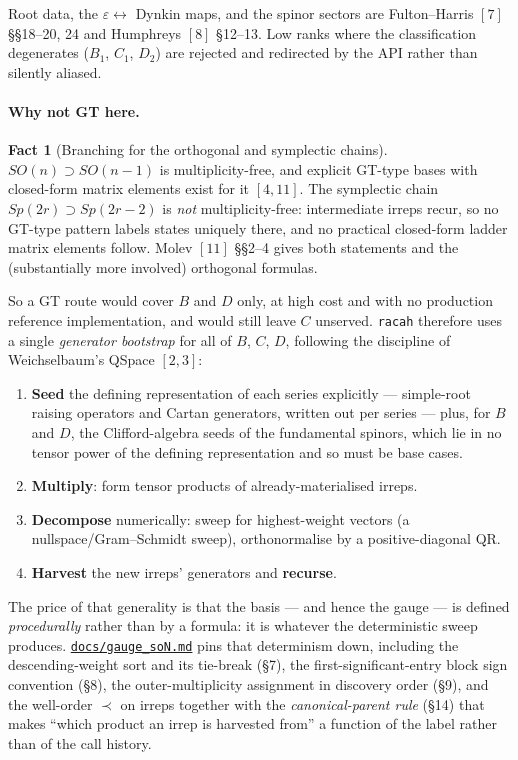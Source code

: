 \documentclass[11pt,a4paper]{article}
\theoremstyle{plain}
\theoremstyle{definition}
\newtheorem{fact}[theorem]{Fact}
\newcommand{\code}[1]{\texttt{#1}}
\newcommand{\gaugeson}{\href{https://github.com/Ryo-wtnb11/fusion-symbols/blob/main/docs/gauge_soN.md}{\code{docs/gauge\_soN.md}}}
\begin{document}
Root data, the $\varepsilon\leftrightarrow$ Dynkin maps, and the spinor sectors
are Fulton--Harris $[7]$ \S\S18--20, 24 and Humphreys $[8]$ \S12--13. Low ranks
where the classification degenerates ($B_1$, $C_1$, $D_2$) are rejected and
redirected by the API rather than silently aliased.

\paragraph{Why not GT here.}

\begin{fact}[Branching for the orthogonal and symplectic chains]
\label{fact:bcdbranch}
$SO(n)\supset SO(n-1)$ is multiplicity-free, and explicit GT-type bases with
closed-form matrix elements exist for it $[4,11]$. The symplectic chain
$Sp(2r)\supset Sp(2r-2)$ is \emph{not} multiplicity-free: intermediate irreps
recur, so no GT-type pattern labels states uniquely there, and no practical
closed-form ladder matrix elements follow. Molev $[11]$ \S\S2--4 gives both
statements and the (substantially more involved) orthogonal formulas.
\end{fact}

So a GT route would cover $B$ and $D$ only, at high cost and with no production
reference implementation, and would still leave $C$ unserved. \code{racah}
therefore uses a single \emph{generator bootstrap} for all of $B$, $C$, $D$,
following the discipline of Weichselbaum's QSpace $[2,3]$:

\begin{enumerate}[leftmargin=1.9em]
  \item \textbf{Seed} the defining representation of each series explicitly ---
    simple-root raising operators and Cartan generators, written out per series
    --- plus, for $B$ and $D$, the Clifford-algebra seeds of the fundamental
    spinors, which lie in no tensor power of the defining representation and so
    must be base cases.
  \item \textbf{Multiply}: form tensor products of already-materialised irreps.
  \item \textbf{Decompose} numerically: sweep for highest-weight vectors (a
    nullspace/Gram--Schmidt sweep), orthonormalise by a positive-diagonal QR.
  \item \textbf{Harvest} the new irreps' generators and \textbf{recurse}.
\end{enumerate}

The price of that generality is that the basis --- and hence the gauge --- is
defined \emph{procedurally} rather than by a formula: it is whatever the
deterministic sweep produces. \gaugeson{} pins that determinism down, including
the descending-weight sort and its tie-break (\S7), the first-significant-entry
block sign convention (\S8), the outer-multiplicity assignment in discovery
order (\S9), and the well-order $\prec$ on irreps together with the
\emph{canonical-parent rule} (\S14) that makes ``which product an irrep is
harvested from'' a function of the label rather than of the call history.
\end{document}
